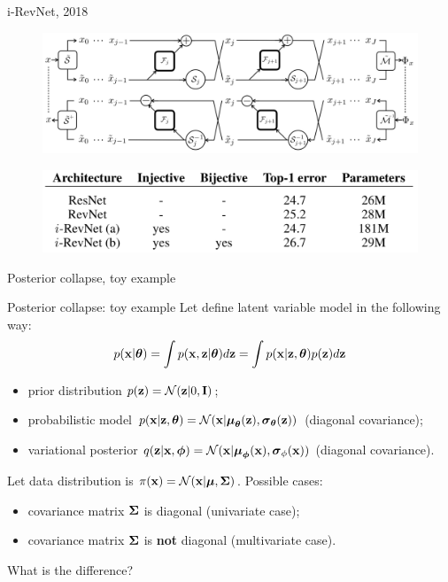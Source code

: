 \begin{frame}{i-RevNet, 2018}
	
	\begin{figure}
		\centering
		\includegraphics[width=\linewidth]{figs/i-revnet.png}
	\end{figure}
	
	\begin{figure}
		\centering
		\includegraphics[width=0.9\linewidth]{figs/i-revnet_block.png}
	\end{figure}

\end{frame}
\begin{frame}{Posterior collapse, toy example}
\end{frame}
\begin{frame}{Posterior collapse: toy example}
	Let define latent variable model in the following way:
	\[
	p(\mathbf{x} | \boldsymbol{\theta}) = \int p(\mathbf{x}, \mathbf{z} | \boldsymbol{\theta}) d \mathbf{z} = \int p(\mathbf{x} | \mathbf{z}, \boldsymbol{\theta}) p(\mathbf{z}) d \mathbf{z} 
	\]
	\begin{itemize}
		\item prior distribution $p(\mathbf{z}) = \mathcal{N}(\mathbf{z}| 0, \mathbf{I})$;
		\item probabilistic model $p(\mathbf{x} | \mathbf{z}, \boldsymbol{\theta}) = \mathcal{N}(\mathbf{x} | \boldsymbol{\mu}_{\boldsymbol{\theta}}(\mathbf{z}), \boldsymbol{\sigma}_{\boldsymbol{\theta}}(\mathbf{z}))$ (diagonal covariance);
		\item variational posterior $q(\mathbf{z} | \mathbf{x}, \boldsymbol{\phi}) =  \mathcal{N}(\mathbf{x} | \boldsymbol{\mu}_{\boldsymbol{\phi}}(\mathbf{x}), \boldsymbol{\sigma}_{\phi}(\mathbf{x}))$  (diagonal covariance).
	\end{itemize}
	
	Let data distribution is $\pi(\mathbf{x}) = \mathcal{N}(\mathbf{x} | \boldsymbol{\mu}, \boldsymbol{\Sigma})$. Possible cases:
	\begin{itemize}
		\item covariance matrix $\boldsymbol{\Sigma}$ is diagonal (univariate case);
		\item covariance matrix $\boldsymbol{\Sigma}$ is \textbf{not} diagonal (multivariate case).
	\end{itemize}
	What is the difference?
\end{frame}

